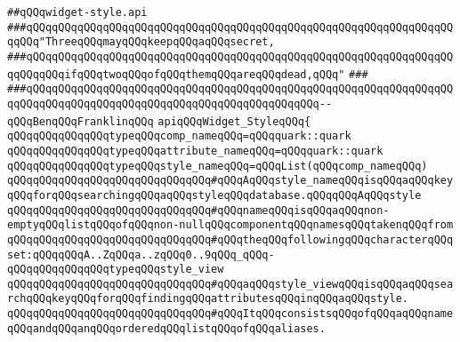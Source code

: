\label{src/lib/x-kit/style/widget-style-ancient.api}
\verb|##qQQqwidget-style.api|\newline
\newline
\newline
\newline
\verb|###qQQqqQQqqQQqqQQqqQQqqQQqqQQqqQQqqQQqqQQqqQQqqQQqqQQqqQQqqQQqqQQqqQQqqQQq"ThreeqQQqmayqQQqkeepqQQqaqQQqsecret,|\newline
\verb|###qQQqqQQqqQQqqQQqqQQqqQQqqQQqqQQqqQQqqQQqqQQqqQQqqQQqqQQqqQQqqQQqqQQqqQQqqQQqifqQQqtwoqQQqofqQQqthemqQQqareqQQqdead,qQQq"|\newline
\verb|###|\newline
\verb|###qQQqqQQqqQQqqQQqqQQqqQQqqQQqqQQqqQQqqQQqqQQqqQQqqQQqqQQqqQQqqQQqqQQqqQQqqQQqqQQqqQQqqQQqqQQqqQQqqQQqqQQqqQQqqQQqqQQq--qQQqBenqQQqFranklinqQQq|\newline
\newline
\newline
\newline
\verb|apiqQQqWidget_StyleqQQq{|\newline
\newline
\verb|qQQqqQQqqQQqqQQqtypeqQQqcomp_nameqQQq=qQQqquark::quark|\newline
\verb|qQQqqQQqqQQqqQQqtypeqQQqattribute_nameqQQq=qQQqquark::quark|\newline
\newline
\verb|qQQqqQQqqQQqqQQqtypeqQQqstyle_nameqQQq=qQQqList(qQQqcomp_nameqQQq)|\newline
\verb|qQQqqQQqqQQqqQQqqQQqqQQqqQQqqQQq#qQQqAqQQqstyle_nameqQQqisqQQqaqQQqkeyqQQqforqQQqsearchingqQQqaqQQqstyleqQQqdatabase.qQQqqQQqAqQQqstyle|\newline
\verb|qQQqqQQqqQQqqQQqqQQqqQQqqQQqqQQq#qQQqnameqQQqisqQQqaqQQqnon-emptyqQQqlistqQQqofqQQqnon-nullqQQqcomponentqQQqnamesqQQqtakenqQQqfrom|\newline
\verb|qQQqqQQqqQQqqQQqqQQqqQQqqQQqqQQq#qQQqtheqQQqfollowingqQQqcharacterqQQqset:qQQqqQQqA..ZqQQqa..zqQQq0..9qQQq_qQQq-|\newline
\newline
\verb|qQQqqQQqqQQqqQQqtypeqQQqstyle_view|\newline
\verb|qQQqqQQqqQQqqQQqqQQqqQQqqQQqqQQq#qQQqaqQQqstyle_viewqQQqisqQQqaqQQqsearchqQQqkeyqQQqforqQQqfindingqQQqattributesqQQqinqQQqaqQQqstyle.|\newline
\verb|qQQqqQQqqQQqqQQqqQQqqQQqqQQqqQQq#qQQqItqQQqconsistsqQQqofqQQqaqQQqnameqQQqandqQQqanqQQqorderedqQQqlistqQQqofqQQqaliases.|\newline
